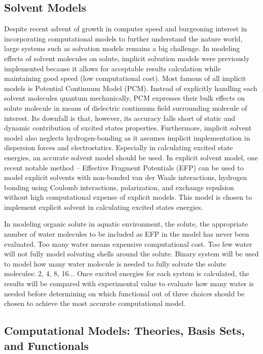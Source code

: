 \documentclass[
journal=jacsat, %
manuscript=article]{achemso}
\begin{document}
\subsection{Solvent Models}

Despite recent advent of growth in computer speed and burgeoning interest in incorporating computational models to further understand the nature world, large systems such as solvation models remains a big challenge.\cite{Lin2007} In modeling effects of solvent molecules on solute, implicit solvation models were previously implemented because it allows for acceptable results calculation while maintaining good speed (low computational cost). Most famous of all implicit models is Potential Continuum Model (PCM).\cite{Cossi2000} Instead of explicitly handling each solvent molecules quantum mechanically, PCM expresses their bulk effects on solute molecule in means of dielectric continuum field surrounding molecule of interest. Its downfall is that, however, its accuracy falls short of static and dynamic contribution of excited states properties.\cite{Barone2007} Furthermore, implicit solvent model also neglects hydrogen-bonding as it assumes implicit implementation in dispersion forces and electrostatics.\cite{Li1999} Especially in calculating excited state energies, an accurate solvent model should be used.\cite{Tomasi2005} In explicit solvent model, one recent notable method – Effective Fragment Potentials (EFP) can be used to model explicit solvents with non-bonded van der Waals interactions, hydrogen bonding using Coulomb interactions, polarization, and exchange repulsion without high computational expense of explicit models.\cite{Day1996,Yoo2008} This model is chosen to implement explicit solvent in calculating excited states energies.

In modeling organic solute in aquatic environment, the solute, the appropriate number of water molecules to be included as EFP in the model has never been evaluated. Too many water means expensive computational cost. Too few water will not fully model solvating shells around the solute. Binary system will be used to model how many water molecule is needed to fully solvate the solute molecules: 2, 4, 8, 16... Once excited energies for each system is calculated, the results will be compared with experimental value to evaluate how many water is needed before determining on which functional out of three choices should be chosen to achieve the most accurate computational model. 

\subsection{Computational Models: Theories, Basis Sets, and Functionals}
\end{document}
